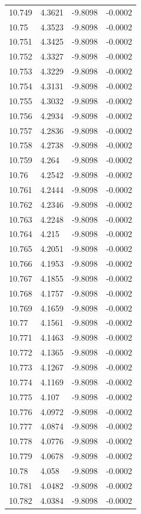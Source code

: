 \begin{tabular}{llll}
10.749 & 4.3621 & -9.8098 & -0.0002 \\
10.75 & 4.3523 & -9.8098 & -0.0002 \\
10.751 & 4.3425 & -9.8098 & -0.0002 \\
10.752 & 4.3327 & -9.8098 & -0.0002 \\
10.753 & 4.3229 & -9.8098 & -0.0002 \\
10.754 & 4.3131 & -9.8098 & -0.0002 \\
10.755 & 4.3032 & -9.8098 & -0.0002 \\
10.756 & 4.2934 & -9.8098 & -0.0002 \\
10.757 & 4.2836 & -9.8098 & -0.0002 \\
10.758 & 4.2738 & -9.8098 & -0.0002 \\
10.759 & 4.264 & -9.8098 & -0.0002 \\
10.76 & 4.2542 & -9.8098 & -0.0002 \\
10.761 & 4.2444 & -9.8098 & -0.0002 \\
10.762 & 4.2346 & -9.8098 & -0.0002 \\
10.763 & 4.2248 & -9.8098 & -0.0002 \\
10.764 & 4.215 & -9.8098 & -0.0002 \\
10.765 & 4.2051 & -9.8098 & -0.0002 \\
10.766 & 4.1953 & -9.8098 & -0.0002 \\
10.767 & 4.1855 & -9.8098 & -0.0002 \\
10.768 & 4.1757 & -9.8098 & -0.0002 \\
10.769 & 4.1659 & -9.8098 & -0.0002 \\
10.77 & 4.1561 & -9.8098 & -0.0002 \\
10.771 & 4.1463 & -9.8098 & -0.0002 \\
10.772 & 4.1365 & -9.8098 & -0.0002 \\
10.773 & 4.1267 & -9.8098 & -0.0002 \\
10.774 & 4.1169 & -9.8098 & -0.0002 \\
10.775 & 4.107 & -9.8098 & -0.0002 \\
10.776 & 4.0972 & -9.8098 & -0.0002 \\
10.777 & 4.0874 & -9.8098 & -0.0002 \\
10.778 & 4.0776 & -9.8098 & -0.0002 \\
10.779 & 4.0678 & -9.8098 & -0.0002 \\
10.78 & 4.058 & -9.8098 & -0.0002 \\
10.781 & 4.0482 & -9.8098 & -0.0002 \\
10.782 & 4.0384 & -9.8098 & -0.0002 \\

\end{tabular}
